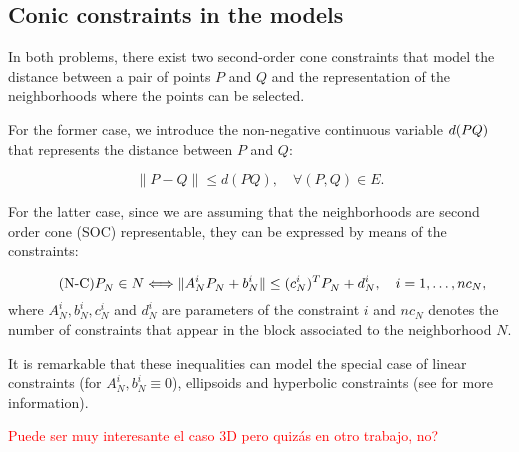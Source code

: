 \documentclass[a4paper]{elsarticle}
\begin{document}
\subsection{Conic constraints in the models}
In both problems, there exist two second-order cone constraints that model the distance between a pair of points $P$ and $Q$ and the representation of the neighborhoods where the points can be selected.

\newcommand{\dvar}[2]{d(#1#2)}

For the former case, we introduce the non-negative continuous variable $\dvar{PQ}$ that represents the distance between $P$ and $Q$:


\begin{equation*}\tag{d-C}\label{eq:dC}
\|P - Q\|\leq \dvar{P}{Q},\quad\forall (P,Q)\in E.
\end{equation*}

For the latter case, since we are assuming that the neighborhoods are second order cone (SOC) representable, they can be expressed by means of the constraints:

\begin{equation*}\tag{N-C}\label{eq:nC}
 P^{}_N\in N \Longleftrightarrow
  \|A_N^i P_N^{} + b_N^i\| \leq (c_N^i)^T P_N^{} + d_N^i,\quad i=1,\ldots,nc_N, \\
\end{equation*}
where $A_N^i, b_N^i, c_N^i$ and $d_N^i$ are parameters of the constraint $i$ and $nc_N$ denotes the number of constraints that appear in the block associated to the neighborhood $N$.

It is remarkable that these inequalities can model the special case of linear constraints (for $A_N^{i}, b_N^i\equiv 0$), ellipsoids and hyperbolic constraints (see \cite{Lobo1998} for more information).

\textcolor{red}{Puede ser muy interesante el caso 3D pero quizás en otro trabajo, no?}
\end{document}
